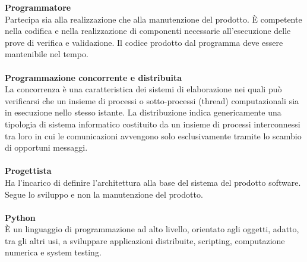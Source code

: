 \textbf{Programmatore}\\ 
Partecipa sia alla realizzazione che alla manutenzione del prodotto. È competente nella codifica e nella realizzazione di componenti necessarie all'esecuzione delle prove di verifica e validazione. Il codice prodotto dal programma deve essere mantenibile nel tempo.\\ \\
\textbf{Programmazione concorrente e distribuita}\\
La concorrenza è una caratteristica dei sistemi di elaborazione nei quali può verificarsi che un insieme di processi o sotto-processi (thread) computazionali sia in esecuzione nello stesso istante. La distribuzione indica genericamente una tipologia di sistema informatico costituito da un insieme di processi interconnessi tra loro in cui le comunicazioni avvengono solo esclusivamente tramite lo scambio di opportuni messaggi. \\ \\
\textbf{Progettista}\\ 
Ha l'incarico di definire l'architettura alla base del sistema del prodotto software. Segue lo sviluppo e non la manutenzione del prodotto. \\ \\
\textbf{Python}\\
È un linguaggio di programmazione ad alto livello, orientato agli oggetti, adatto, tra gli altri usi, a sviluppare applicazioni distribuite, scripting, computazione numerica e system testing. \\ \\
\clearpage